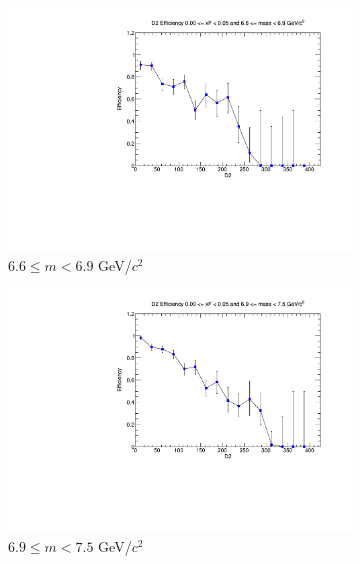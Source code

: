 \documentclass[11pt]{article}
\begin{document}
\begin{figure}[p]
\begin{subfigure}[b]{0.32\textwidth}
        \includegraphics[width=\textwidth]{./kTrackerEfficiencyPlots/D2_Efficiency_xF0_mass8.pdf}
        \caption{$6.6 \leq m < 6.9$ GeV/$c^2$}
    \end{subfigure}\vspace{0.5cm}
    \begin{subfigure}[b]{0.32\textwidth}
        \centering
        \includegraphics[width=\textwidth]{./kTrackerEfficiencyPlots/D2_Efficiency_xF0_mass9.pdf}
        \caption{$6.9 \leq m < 7.5$ GeV/$c^2$}
    \end{subfigure}\hfill
    \begin{subfigure}[b]{0.32\textwidth}
        \centering

\end{subfigure}
\end{figure}
\end{document}
